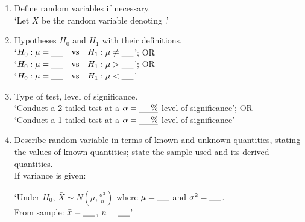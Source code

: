 \documentclass[../main]{subfiles}
\begin{document}
	\begin{enumerate}
		\item Define random variables if necessary. \\

			`Let \(X\) be the random variable denoting \underline{\hspace{0.5cm}}.' \\

		\item Hypotheses \(H_0\) and \(H_1\) with their definitions. \\

			`\(H_0 : \mu = \text{\underline{\hspace{0.5cm}}} \quad \text{vs} \quad H_1 : \mu \neq \text{\underline{\hspace{0.5cm}}} \)'; OR \\
			`\(H_0 : \mu = \text{\underline{\hspace{0.5cm}}} \quad \text{vs} \quad H_1 : \mu > \text{\underline{\hspace{0.5cm}}} \)'; OR \\
			`\(H_0 : \mu = \text{\underline{\hspace{0.5cm}}} \quad \text{vs} \quad H_1 : \mu < \text{\underline{\hspace{0.5cm}}} \)' \\

		\item Type of test, level of significance. \\

			`Conduct a 2-tailed test at a \(\alpha = \text{\underline{\hspace{0.5cm}\%}}\) level of significance'; OR \\
			`Conduct a 1-tailed test at a \(\alpha = \text{\underline{\hspace{0.5cm}\%}}\) level of significance' \\

		\item Describe random variable in terms of known and unknown quantities, stating the values of known quantities; state the sample used and its derived quantities.\\ 

			If variance is given: 

			`Under \(H_0\), \(\bar{X} \sim N \left( \mu, \frac{\sigma^2}{n} \right) \) where \(\mu = \text{\underline{\hspace{0.5cm}}}\) and \(\sigma^2 = \text{\underline{\hspace{0.5cm}}} \). \\ From sample: \(\bar{x} = \text{\underline{\hspace{0.5cm}}}\), \(n = \text{\underline{\hspace{0.5cm}}}\)' \\


\end{enumerate}
\end{document}
